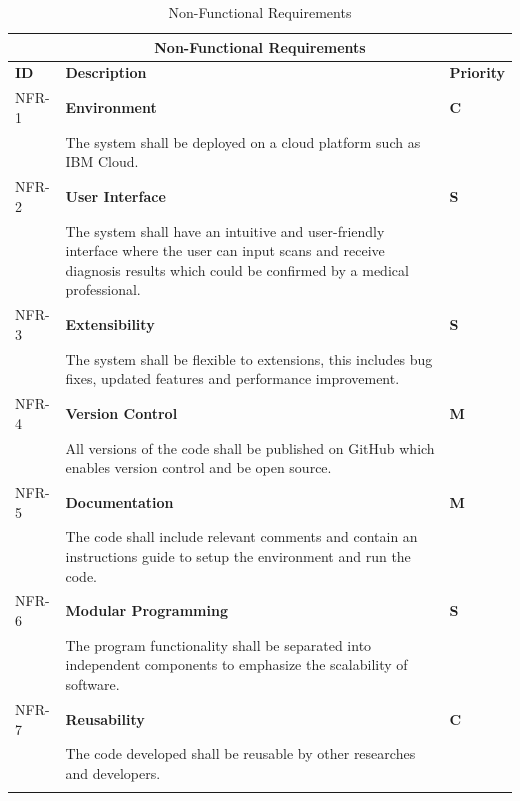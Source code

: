 \vspace{5em}
\begin{longtable}{| p{} | p{} | p{} |} 
  
  \hline
  \multicolumn{3}{|c|}{\textbf{Non-Functional Requirements}}\\
  \hline
  \textbf{ID} & \textbf{Description} & \textbf{Priority}  \\
  \hline
  NFR-1 & \textbf{Environment}  & \cellcolor{yellow}\textbf{C} \\ & The system shall be deployed on a cloud platform such as IBM Cloud. & \cellcolor{yellow} \\ \hline 
  NFR-2 & \textbf{User Interface}  & \cellcolor{cyan}\textbf{S} \\ &   The system shall have an intuitive and user-friendly interface where the user can input scans and receive diagnosis results which could be confirmed by a medical professional. & \cellcolor{cyan} \\ \hline 
  NFR-3 & \textbf{Extensibility}  & \cellcolor{cyan}\textbf{S} \\ & The system shall be flexible to extensions, this includes bug fixes, updated features and performance improvement.& \cellcolor{cyan} \\ \hline 
  NFR-4 & \textbf{Version Control}  & \cellcolor{green}\textbf{M} \\ & All versions of the code shall be published on GitHub which enables version control and be open source.& \cellcolor{green} \\ \hline 
  NFR-5 & \textbf{Documentation}  & \cellcolor{green}\textbf{M} \\ & The code shall include relevant comments and contain an instructions guide to setup the environment and run the code. & \cellcolor{green} \\ \hline 
  NFR-6 & \textbf{Modular Programming}  & \cellcolor{cyan}\textbf{S} \\ & The program functionality shall be separated into independent components to emphasize the scalability of software.& \cellcolor{cyan} \\ \hline 
  NFR-7 & \textbf{Reusability}  & \cellcolor{yellow}\textbf{C} \\ & The code developed shall be reusable by other researches and developers. & \cellcolor{yellow} \\ \hline 

  \caption{Non-Functional Requirements}
  
    \label{tab:Non-Functional Requirements}
    \end{longtable}



